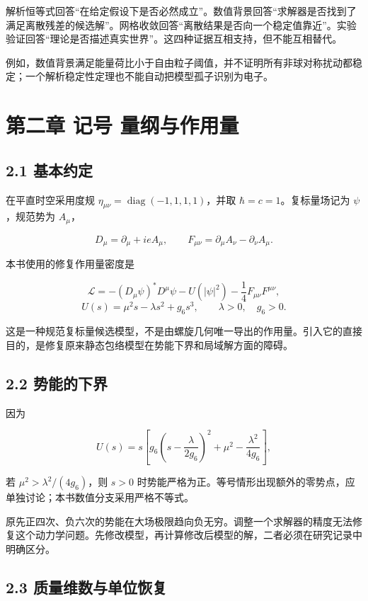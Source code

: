 \documentclass[UTF8,fontset=fandol,11pt]{ctexart}
\begin{document}
解析恒等式回答“在给定假设下是否必然成立”。数值背景回答“求解器是否找到了满足离散残差的候选解”。网格收敛回答“离散结果是否向一个稳定值靠近”。实验验证回答“理论是否描述真实世界”。这四种证据互相支持，但不能互相替代。

例如，数值背景满足能量荷比小于自由粒子阈值，并不证明所有非球对称扰动都稳定；一个解析稳定性定理也不能自动把模型孤子识别为电子。

\section*{第二章 记号 量纲与作用量}

\subsection*{2.1 基本约定}

在平直时空采用度规 \(\eta_{\mu\nu}=\operatorname{diag}(-1,1,1,1)\)，并取 \(\hbar=c=1\)。复标量场记为 \(\psi\)，规范势为 \(A_\mu\)，

\[
D_\mu=\partial_\mu+ieA_\mu,\qquad
F_{\mu\nu}=\partial_\mu A_\nu-\partial_\nu A_\mu.
\tag{2.1}
\]

本书使用的修复作用量密度是

\[
\mathcal L=-(D_\mu\psi)^*D^\mu\psi
-U(|\psi|^2)-\frac14F_{\mu\nu}F^{\mu\nu},
\tag{2.2}
\]
\[
U(s)=\mu^2s-\lambda s^2+g_6s^3,
\qquad \lambda>0,\quad g_6>0.
\tag{2.3}
\]

这是一种规范复标量候选模型，不是由螺旋几何唯一导出的作用量。引入它的直接目的，是修复原来静态包络模型在势能下界和局域解方面的障碍。

\subsection*{2.2 势能的下界}

因为

\[
U(s)=s\left[g_6\left(s-\frac{\lambda}{2g_6}\right)^2
+\mu^2-\frac{\lambda^2}{4g_6}\right],
\tag{2.4}
\]

若 \(\mu^2>\lambda^2/(4g_6)\)，则 \(s>0\) 时势能严格为正。等号情形出现额外的零势点，应单独讨论；本书数值分支采用严格不等式。

原先正四次、负六次的势能在大场极限趋向负无穷。调整一个求解器的精度无法修复这个动力学问题。先修改模型，再计算修改后模型的解，二者必须在研究记录中明确区分。

\subsection*{2.3 质量维数与单位恢复}
\end{document}
